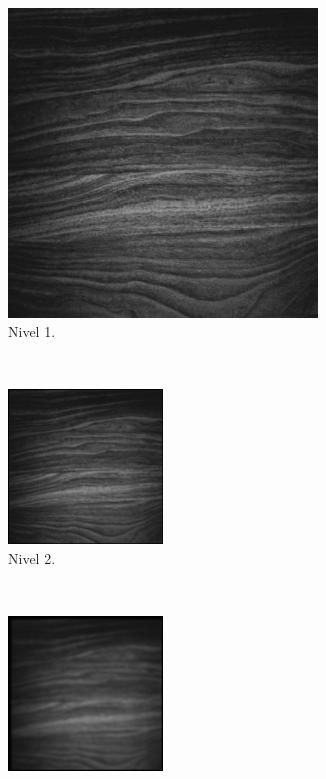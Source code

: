 \documentclass[12pt, letterpaper]{article}
\begin{document}
\begin{figure}[H]
  \centering
  \begin{subfigure}[t]{0.48\textwidth}
    \centering
    \includegraphics[width = 0.9\textwidth]{madera/gp1.png}
    \caption{Nivel 1.}
  \end{subfigure}
  ~ 
  \begin{subfigure}[t]{0.48\textwidth}
      \centering
      \includegraphics[width = 0.45\textwidth]{madera/gp2.png}
      \caption{Nivel 2.}
  \end{subfigure}
  ~ 
  \begin{subfigure}[t]{0.32\textwidth}
      \centering
      \includegraphics[width = 0.45\textwidth]{madera/gp3.png}

\end{subfigure}
\end{figure}
\end{document}
